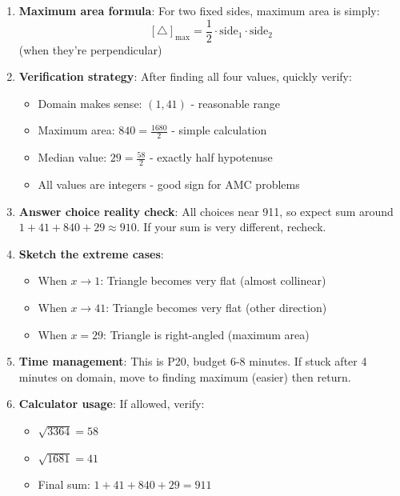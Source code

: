 \documentclass[12pt]{article}
\begin{document}
\begin{tipbox}
\begin{enumerate}
    \item \textbf{Maximum area formula}: For two fixed sides, maximum area is simply:
    $$[\triangle]_{\max} = \frac{1}{2} \cdot \text{side}_1 \cdot \text{side}_2$$
    (when they're perpendicular)
    
    \item \textbf{Verification strategy}: After finding all four values, quickly verify:
    \begin{itemize}
        \item Domain makes sense: $(1, 41)$ - reasonable range
        \item Maximum area: $840 = \frac{1680}{2}$ - simple calculation
        \item Median value: $29 = \frac{58}{2}$ - exactly half hypotenuse
        \item All values are integers - good sign for AMC problems
    \end{itemize}
    
    \item \textbf{Answer choice reality check}: All choices near 911, so expect sum around $1 + 41 + 840 + 29 \approx 910$. If your sum is very different, recheck.
    
    \item \textbf{Sketch the extreme cases}:
    \begin{itemize}
        \item When $x \to 1$: Triangle becomes very flat (almost collinear)
        \item When $x \to 41$: Triangle becomes very flat (other direction)
        \item When $x = 29$: Triangle is right-angled (maximum area)
    \end{itemize}
    
    \item \textbf{Time management}: This is P20, budget 6-8 minutes. If stuck after 4 minutes on domain, move to finding maximum (easier) then return.
    
    \item \textbf{Calculator usage}: If allowed, verify:
    \begin{itemize}
        \item $\sqrt{3364} = 58$
        \item $\sqrt{1681} = 41$
        \item Final sum: $1 + 41 + 840 + 29 = 911$
    \end{itemize}
\end{enumerate}
\end{tipbox}
\end{document}
